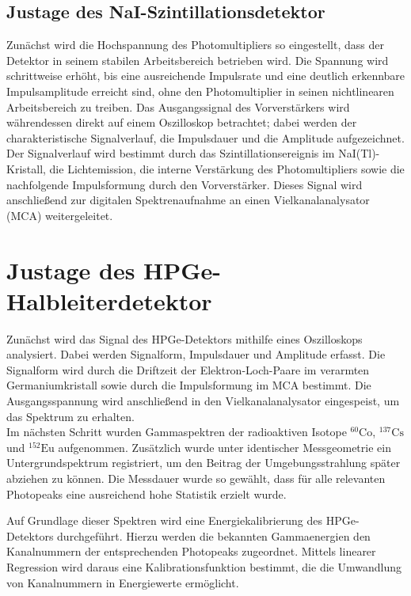 \subsection{Justage des NaI-Szintillationsdetektor}

Zunächst wird die Hochspannung des Photomultipliers so eingestellt, dass der Detektor in seinem stabilen Arbeitsbereich betrieben wird. Die Spannung wird schrittweise erhöht, bis eine ausreichende Impulsrate und eine deutlich erkennbare Impulsamplitude erreicht sind, ohne den Photomultiplier in seinen nichtlinearen Arbeitsbereich zu treiben. Das Ausgangssignal des Vorverstärkers wird währendessen direkt auf einem Oszilloskop betrachtet; dabei werden der charakteristische Signalverlauf, die Impulsdauer und die Amplitude aufgezeichnet. Der Signalverlauf wird bestimmt durch das Szintillationsereignis im NaI(Tl)-Kristall, die Lichtemission, die interne Verstärkung des Photomultipliers sowie die nachfolgende Impulsformung durch den Vorverstärker. Dieses Signal wird anschließend  zur digitalen Spektrenaufnahme an einen Vielkanalanalysator (MCA) weitergeleitet.\\





\section{Justage des HPGe-Halbleiterdetektor}

Zunächst wird das Signal des HPGe-Detektors mithilfe eines Oszilloskops analysiert. Dabei werden Signalform, Impulsdauer und Amplitude erfasst. Die Signalform wird durch die Driftzeit der Elektron-Loch-Paare im verarmten Germaniumkristall sowie durch die Impulsformung im MCA bestimmt. Die Ausgangsspannung wird anschließend in den Vielkanalanalysator eingespeist, um das Spektrum zu erhalten.\\

Im nächsten Schritt wurden Gammaspektren der radioaktiven Isotope $^{60}\mathrm{Co}$, $^{137}\mathrm{Cs}$ und $^{152}\mathrm{Eu}$ aufgenommen. Zusätzlich wurde unter identischer Messgeometrie ein Untergrundspektrum
registriert, um den Beitrag der Umgebungsstrahlung später abziehen zu können. Die Messdauer wurde so gewählt, dass für alle relevanten Photopeaks eine ausreichend hohe Statistik erzielt wurde.

Auf Grundlage dieser Spektren wird eine Energiekalibrierung des HPGe-Detektors durchgeführt. Hierzu werden die bekannten Gammaenergien den Kanalnummern der entsprechenden Photopeaks zugeordnet. Mittels linearer Regression wird daraus eine Kalibrationsfunktion bestimmt, die die Umwandlung von Kanalnummern in
Energiewerte ermöglicht.

